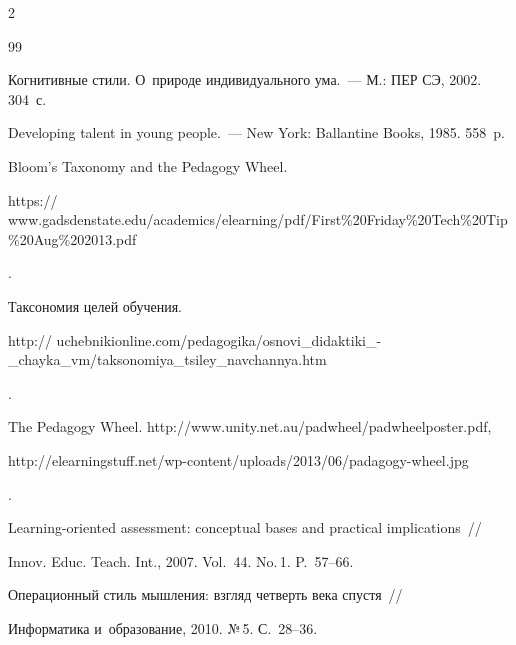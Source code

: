 \begin{multicols}{2}
{{\begin{thebibliography}{99}


 Когнитивные стили. О~природе индивидуального ума.~--- М.: ПЕР СЭ, 2002. 304~с.




 Developing talent in young people.~--- New York: Ballantine Books, 1985. 558~p.







Bloom's Taxonomy and the Pedagogy Wheel. {\sf


https:// www.gadsdenstate.edu/academics/elearning/pdf/First\linebreak \%20Friday\%20Tech\%20Tip\%20Aug\%202013.pdf}.




 Таксономия целей обучения. {\sf


http:// uchebnikionline.com/pedagogika/osnovi\_didaktiki\_-\_chayka\_vm/taksonomiya\_tsiley\_navchannya.htm}.







The Pedagogy Wheel. {\sf http://www.unity.net.au/\linebreak padwheel/padwheelposter.pdf}, {\sf


http://elearningstuff.\linebreak net/wp-content/uploads/2013/06/padagogy-wheel.jpg}.





\pagebreak












Learning-oriented assessment: conceptual bases and practical implications~//


Innov. Educ. Teach. Int., 2007. Vol.~44. No.\,1. P.~57--66.




 Операционный стиль мышления: взгляд четверть века спустя~//


Информатика и~образование, 2010. №\,5. С.~28--36.


 \end{thebibliography}





 }


 }





\end{multicols}





